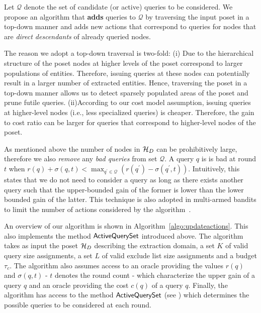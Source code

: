 Let $\mathcal{Q}$ denote the set of candidate (or active) queries to be considered. We propose an algorithm that {\bf adds} queries to $\mathcal{Q}$ by traversing the input poset in a top-down manner and adds new actions that correspond to queries for nodes that are {\em direct descendants} of already queried nodes. 

The reason we adopt a top-down traversal is two-fold: (i) Due to the hierarchical structure of the poset nodes at higher levels of the poset correspond to larger populations of entities. Therefore, issuing queries at these nodes can potentially result in a larger number of extracted entities. Hence, traversing the poset in a top-down manner allows us to detect sparsely populated areas of the poset and prune futile queries. (ii)According to our cost model assumption, issuing queries at higher-level nodes (i.e., less specialized queries) is cheaper. Therefore, the gain to cost ratio can be larger for queries that correspond to higher-level nodes of the poset.

As mentioned above the number of nodes in $\mathcal{H}_D$ can be prohibitively large, therefore we also {\em remove} any {\em bad queries} from set $\mathcal{Q}$. A query $q$ is is bad at round $t$ when $r(q) + \sigma(q,t) < \max_{q^{\prime} \in \mathcal{Q}} (r(q^{\prime}) - \sigma(q^{\prime},t))$. Intuitively, this states that we do not need to consider a query as long as there exists another query such that the upper-bounded gain of the former is lower than the lower bounded gain of the latter. This technique is also adopted in multi-armed bandits to limit the number of actions considered by the algorithm~\cite{EvenDar06actionelimination}. 


An overview of our algorithm is shown in Algorithm~\ref{algo:updateactions}. This also implements the method ${\sf ActiveQuerySet}$ introduced above. The algorithm takes as input the poset $\mathcal{H}_D$ describing the extraction domain, a set $K$ of valid query size assignments, a set $L$ of valid exclude list size assignments and a budget $\tau_c$. The algorithm also assumes access to an oracle providing the values $r(q)$ and $\sigma(q,t)$ - $t$ denotes the round count -  which characterize the upper gain of a query $q$ and an oracle providing the cost $c(q)$ of a query $q$. Finally, the algorithm has access to the method ${\sf ActiveQuerySet}$ (see ) which determines the possible queries to be considered at each round.

